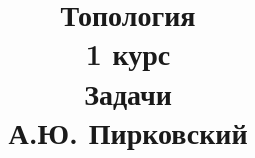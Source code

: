 \documentclass[fleqn]{article}
\title{Топология \\ 1 курс \\ Задачи \\  А.Ю. Пирковский}
\date{}
\begin{document}
	\maketitle
	\pagebreak	
	\tableofcontents
		
		
		
		
	
\end{document}
